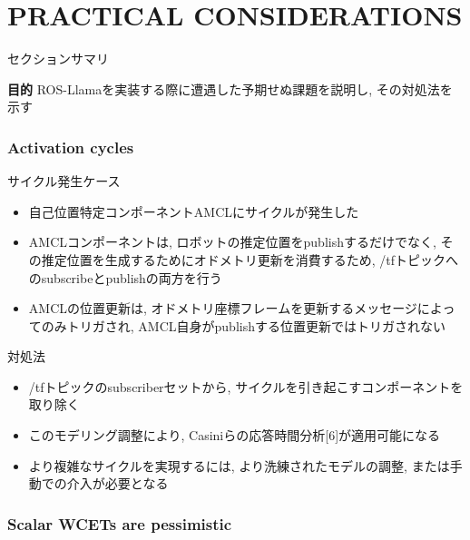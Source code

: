 
\section{PRACTICAL CONSIDERATIONS}
\label{sec: practical considerations}

\begin{frame}{セクションサマリ}
    \begin{itembox}[l]{\textbf{目的}}
        ROS-Llamaを実装する際に遭遇した予期せぬ課題を説明し, その対処法を示す
    \end{itembox}
\end{frame}


\subsubsection{Activation cycles}
\label{sssec: activation cycles}

\begin{frame}{サイクル発生ケース}
    \begin{itemize}
        \item 自己位置特定コンポーネントAMCLにサイクルが発生した
        \item AMCLコンポーネントは, ロボットの推定位置をpublishするだけでなく, その推定位置を生成するためにオドメトリ更新を消費するため, /tfトピックへのsubscribeとpublishの両方を行う
        \item AMCLの位置更新は, オドメトリ座標フレームを更新するメッセージによってのみトリガされ, AMCL自身がpublishする位置更新ではトリガされない
    \end{itemize}
\end{frame}

\begin{frame}{対処法}
    \begin{itemize}
        \item /tfトピックのsubscriberセットから, サイクルを引き起こすコンポーネントを取り除く
        \item このモデリング調整により, Casiniらの応答時間分析[6]が適用可能になる
        \item より複雑なサイクルを実現するには, より洗練されたモデルの調整, または手動での介入が必要となる
    \end{itemize}
\end{frame}


\subsubsection{Scalar WCETs are pessimistic}
\label{sssec: scalar wcets are pessimistic}

